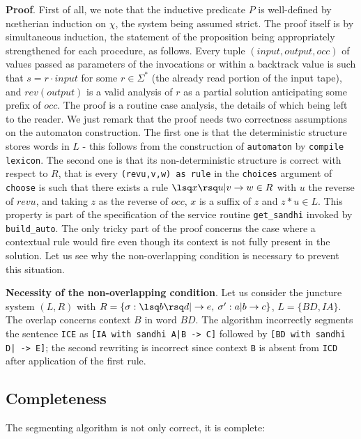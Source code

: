 \noindent
{\bf Proof}. First of all, we note that the inductive predicate
$P$ is well-defined by n{\oe}therian induction on $\chi$, 
the system being assumed strict. The proof itself is
by simultaneous induction, the statement of the 
proposition being appropriately strengthened for each procedure, as follows.
Every tuple $(input,output,occ)$ of values passed as parameters of the
invocations or within a backtrack value is such that $s=r\cdot input$ for
some $r\in\Sigma^*$ (the already read portion of the input tape),
and $rev(output)$ is a valid analysis of 
$r$ as a partial solution anticipating some prefix of $occ$. 
The proof is a routine case analysis, the details of
which being left to the reader. We just remark that the proof needs 
two correctness assumptions on the automaton construction. The first one is
that the deterministic structure stores words in $L$ - this follows from the
construction of \verb:automaton: by \verb:compile lexicon:. The second one
is that its non-deterministic structure is correct with respect to $R$,
that is every \verb:(revu,v,w) as rule: in the \verb:choices: argument of
\verb:choose: is such that
there exists a rule $\lsq x\rsq u|v\rightarrow w\in R$ with 
$u$ the reverse of $revu$, and taking $z$ as the reverse of $occ$,
$x$ is a suffix of $z$ and $z*u\in L$. 
This property is part of the specification of
the service routine \verb:get_sandhi: invoked by \verb:build_auto:.
The only tricky part of the proof concerns the case where a contextual rule
would fire even though its context is not fully present in the solution.
Let us see why the non-overlapping condition is necessary to prevent this
situation.

\noindent 
{\bf Necessity of the non-overlapping condition}.
Let us consider the juncture system $(L,R)$ with 
$R=\{\sigma:\lsq b\rsq d|\rightarrow e, \:\sigma':a|b\rightarrow c\}$,
$L=\{BD,IA\}$. The overlap concerns context $B$ in word $BD$. 
The algorithm incorrectly segments the sentence \verb:ICE: as
\verb:[IA with sandhi A|B -> C]: 
followed by \verb:[BD with sandhi D| -> E]:; the second rewriting is
incorrect since context \verb:B: is absent from \verb:ICD: after application
of the first rule. 

\subsection{Completeness}

The segmenting algorithm is not only correct, it is complete:

